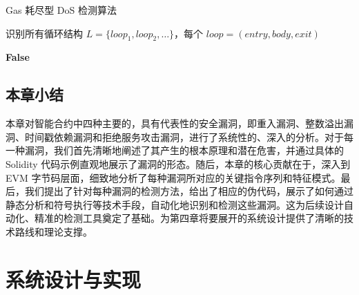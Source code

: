 \documentclass[print, master, vlined, timesmath]{DissertUESTC}
\begin{document}
\begin{algorithm}[H]
    \caption{Gas 耗尽型 DoS 检测算法}
    
    识别所有循环结构 $L = \{loop_1, loop_2, \dots\}$，每个 $loop = (entry, body, exit)$\;
    
    
    \Return \textbf{False}
    \label{alg:gas_dos_detection}
\end{algorithm}
    

\section{本章小结}

本章对智能合约中四种主要的，具有代表性的安全漏洞，即重入漏洞、整数溢出漏洞、时间戳依赖漏洞和拒绝服务攻击漏洞，进行了系统性的、深入的分析。对于每一种漏洞，我们首先清晰地阐述了其产生的根本原理和潜在危害，并通过具体的 Solidity 代码示例直观地展示了漏洞的形态。随后，本章的核心贡献在于，深入到 EVM 字节码层面，细致地分析了每种漏洞所对应的关键指令序列和特征模式。最后，我们提出了针对每种漏洞的检测方法，给出了相应的伪代码，展示了如何通过静态分析和符号执行等技术手段，自动化地识别和检测这些漏洞。这为后续设计自动化、精准的检测工具奠定了基础。为第四章将要展开的系统设计提供了清晰的技术路线和理论支撑。

\chapter{系统设计与实现}
\end{document}
